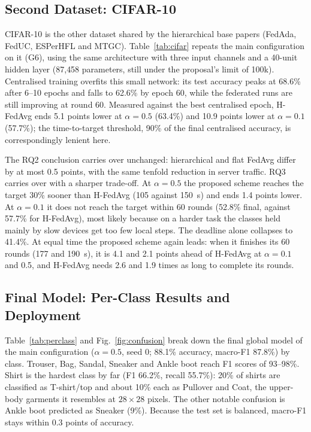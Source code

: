 \documentclass[conference]{IEEEtran}
\begin{document}
\subsection{Second Dataset: CIFAR-10}
CIFAR-10 is the other dataset shared by the hierarchical base papers (FedAda, FedUC, ESPerHFL and MTGC). Table~\ref{tab:cifar} repeats the main configuration on it (G6), using the same architecture with three input channels and a 40-unit hidden layer (87{,}458 parameters, still under the proposal's limit of 100k). Centralised training overfits this small network: its test accuracy peaks at 68.6\% after 6--10 epochs and falls to 62.6\% by epoch 60, while the federated runs are still improving at round 60. Measured against the best centralised epoch, H-FedAvg ends 5.1 points lower at $\alpha = 0.5$ (63.4\%) and 10.9 points lower at $\alpha = 0.1$ (57.7\%); the time-to-target threshold, 90\% of the final centralised accuracy, is correspondingly lenient here.

The RQ2 conclusion carries over unchanged: hierarchical and flat FedAvg differ by at most 0.5 points, with the same tenfold reduction in server traffic. RQ3 carries over with a sharper trade-off. At $\alpha = 0.5$ the proposed scheme reaches the target 30\% sooner than H-FedAvg (105 against 150~s) and ends 1.4 points lower. At $\alpha = 0.1$ it does not reach the target within 60 rounds (52.8\% final, against 57.7\% for H-FedAvg), most likely because on a harder task the classes held mainly by slow devices get too few local steps. The deadline alone collapses to 41.4\%. At equal time the proposed scheme again leads: when it finishes its 60 rounds (177 and 190~s), it is 4.1 and 2.1 points ahead of H-FedAvg at $\alpha = 0.1$ and 0.5, and H-FedAvg needs 2.6 and 1.9 times as long to complete its rounds.

\begin{table}[t]
\centering
\caption{Main configuration on CIFAR-10 ($E = 4$, $K = 5$, mixed tiers; mean over three seeds). The target is 90\% of the final CIFAR-10 centralised accuracy; centralised training peaks earlier, at 68.6\%. n.r.: target not reached within 60 rounds by all seeds.}
\label{tab:cifar}
\footnotesize

\end{table}

\subsection{Final Model: Per-Class Results and Deployment}
Table~\ref{tab:perclass} and Fig.~\ref{fig:confusion} break down the final global model of the main configuration ($\alpha = 0.5$, seed 0; 88.1\% accuracy, macro-F1 87.8\%) by class. Trouser, Bag, Sandal, Sneaker and Ankle boot reach F1 scores of 93--98\%. Shirt is the hardest class by far (F1 66.2\%, recall 55.7\%): 20\% of shirts are classified as T-shirt/top and about 10\% each as Pullover and Coat, the upper-body garments it resembles at $28 \times 28$ pixels. The other notable confusion is Ankle boot predicted as Sneaker (9\%). Because the test set is balanced, macro-F1 stays within 0.3 points of accuracy.
\end{document}
